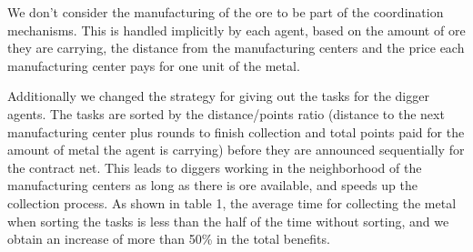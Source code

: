 We don’t consider the manufacturing of the ore to be part of the coordination mechanisms. This is handled implicitly by each agent, based on the amount of ore they are carrying, the distance from the manufacturing centers and the price each manufacturing center pays for one unit of the metal.


Additionally we changed the strategy for giving out the tasks for the digger agents. The tasks are sorted by the distance/points ratio (distance to the next manufacturing center plus rounds to finish collection and total points paid for the amount of metal the agent is carrying) before they are announced sequentially for the contract net. This leads to diggers working in the neighborhood of the manufacturing centers as long as there is ore available, and speeds up the collection process. As shown in table 1, the average time for collecting the metal when sorting the tasks is less than the half of the time without sorting, and we obtain an increase of more than 50\% in the total benefits.

